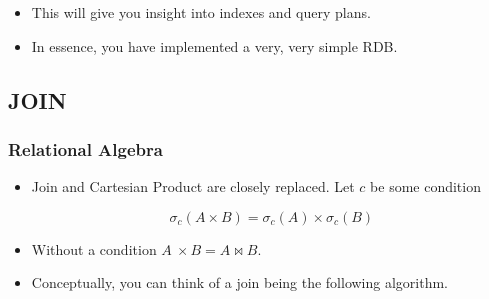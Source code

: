 \documentclass[11pt]{article}
\providecommand{\tightlist}{%
      \setlength{\itemsep}{0pt}\setlength{\parskip}{0pt}}
\begin{document}
\begin{itemize}
\item
  This will give you insight into indexes and query plans.
\item
  In essence, you have implemented a very, very simple RDB.
\end{itemize}

    \subsection{JOIN}\label{join}

\subsubsection{Relational Algebra}\label{relational-algebra}

\begin{itemize}
\tightlist
\item
  Join and Cartesian Product are closely replaced. Let \(c\) be some
  condition

  \begin{equation}
  \sigma_c(A \times B) = \sigma_c(A) \times \sigma_c(B) 
  \end{equation}
\item
  Without a condition \(A\  \times B = A \bowtie B\).
\end{itemize}

 

    \begin{itemize}
\tightlist
\item
  Conceptually, you can think of a join being the following algorithm.
\end{itemize}
\end{document}
